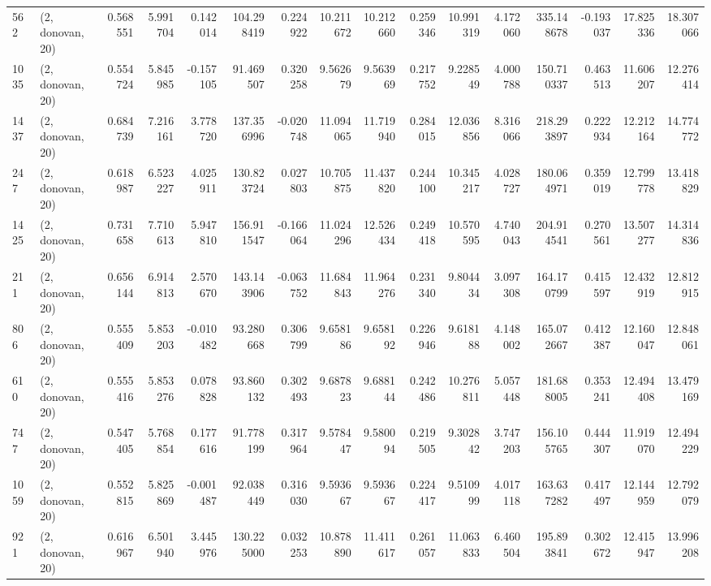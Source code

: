 \begin{tabular}{llrrrrrrrrrrrrrr}
562  &  (2, donovan, 20) &   0.568551 &   5.991704 &   0.142014 &    104.298419 &    0.224922 &   10.211672 &   10.212660 &  0.259346 &  10.991319 &   4.172060 &   335.148678 &  -0.193037 &  17.825336 &  18.307066 \\
1035 &  (2, donovan, 20) &   0.554724 &   5.845985 &  -0.157105 &     91.469507 &    0.320258 &    9.562679 &    9.563969 &  0.217752 &   9.228549 &   4.000788 &   150.710337 &   0.463513 &  11.606207 &  12.276414 \\
1437 &  (2, donovan, 20) &   0.684739 &   7.216161 &   3.778720 &    137.356996 &   -0.020748 &   11.094065 &   11.719940 &  0.284015 &  12.036856 &   8.316066 &   218.293897 &   0.222934 &  12.212164 &  14.774772 \\
247  &  (2, donovan, 20) &   0.618987 &   6.523227 &   4.025911 &    130.823724 &    0.027803 &   10.705875 &   11.437820 &  0.244100 &  10.345217 &   4.028727 &   180.064971 &   0.359019 &  12.799778 &  13.418829 \\
1425 &  (2, donovan, 20) &   0.731658 &   7.710613 &   5.947810 &    156.911547 &   -0.166064 &   11.024296 &   12.526434 &  0.249418 &  10.570595 &   4.740043 &   204.914541 &   0.270561 &  13.507277 &  14.314836 \\
211  &  (2, donovan, 20) &   0.656144 &   6.914813 &   2.570670 &    143.143906 &   -0.063752 &   11.684843 &   11.964276 &  0.231340 &   9.804434 &   3.097308 &   164.170799 &   0.415597 &  12.432919 &  12.812915 \\
806  &  (2, donovan, 20) &   0.555409 &   5.853203 &  -0.010482 &     93.280668 &    0.306799 &    9.658186 &    9.658192 &  0.226946 &   9.618188 &   4.148002 &   165.072667 &   0.412387 &  12.160047 &  12.848061 \\
610  &  (2, donovan, 20) &   0.555416 &   5.853276 &   0.078828 &     93.860132 &    0.302493 &    9.687823 &    9.688144 &  0.242486 &  10.276811 &   5.057448 &   181.688005 &   0.353241 &  12.494408 &  13.479169 \\
747  &  (2, donovan, 20) &   0.547405 &   5.768854 &   0.177616 &     91.778199 &    0.317964 &    9.578447 &    9.580094 &  0.219505 &   9.302842 &   3.747203 &   156.105765 &   0.444307 &  11.919070 &  12.494229 \\
1059 &  (2, donovan, 20) &   0.552815 &   5.825869 &  -0.001487 &     92.038449 &    0.316030 &    9.593667 &    9.593667 &  0.224417 &   9.510999 &   4.017118 &   163.637282 &   0.417497 &  12.144959 &  12.792079 \\
921  &  (2, donovan, 20) &   0.616967 &   6.501940 &   3.445976 &    130.225000 &    0.032253 &   10.878890 &   11.411617 &  0.261057 &  11.063833 &   6.460504 &   195.893841 &   0.302672 &  12.415947 &  13.996208 \\

\end{tabular}
